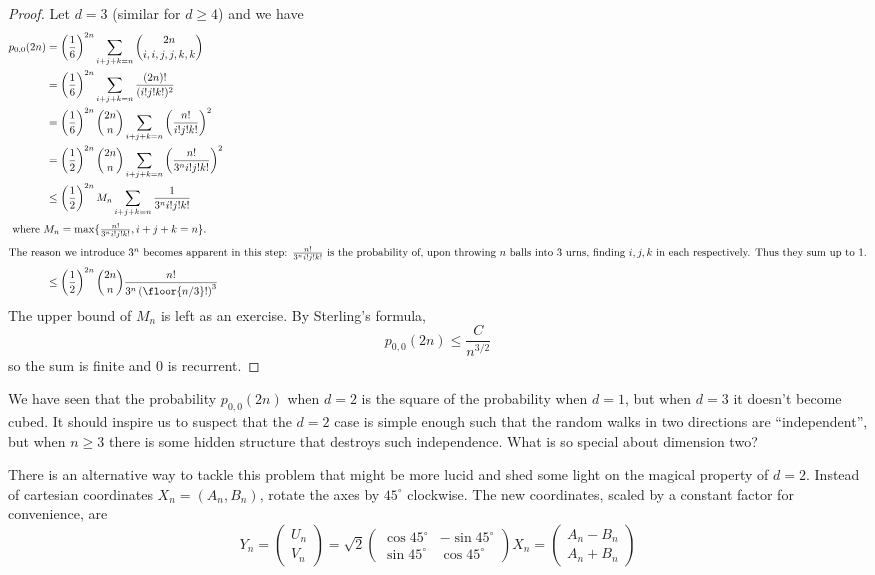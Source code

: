 \documentclass[a4paper]{article}
\begin{document}
\begin{proof}
  Let \(d = 3\) (similar for \(d \geq 4\)) and we have
  \begin{align*}
    p_{0,0}(2n) &= \left( \frac{1}{6} \right)^{2n} \sum_{i+j+k = n} \binom{2n}{i,i,j,j,k,k} \\
                &= \left( \frac{1}{6} \right)^{2n} \sum_{i+j+k = n}^{}\frac{(2n)!}{(i! j! k!)^2} \\
                &= \left( \frac{1}{6} \right)^{2n} \binom{2n}{n} \sum_{i+j+k = n}^{} \left( \frac{n!}{i! j! k!} \right)^2 \\ 
                &=  \left( \frac{1}{2} \right)^{2n} \binom{2n}{n} \sum_{i+j+k = n}^{} \left( \frac{n!}{3^n i! j! k!} \right)^2 \\
                &\leq \left( \frac{1}{2} \right)^{2n} M_n \sum_{i+j+k = n}^{}\frac{1}{3^n i! j! k!} \\
    \intertext{ where \(M_n = \max \{ \frac{n!}{3^n i!j!k!}, i+j+k = n \} \).}
    \intertext{The reason we introduce \(3^n\) becomes apparent in this step: \( \frac{n!}{3^n i! j! k!}\) is the probability of, upon throwing \(n\) balls into \(3\) urns, finding \(i, j, k\) in each respectively. Thus they sum up to \(1\).}
                &\leq \left( \frac{1}{2} \right)^{2n} \binom{2n}{n} \frac{n!}{3^n \left( \floor{n/3}! \right)^3}
  \end{align*}
  The upper bound of \(M_n\) is left as an exercise. By Sterling's formula,
  \[
    p_{0,0}(2n) \leq \frac{C}{n^{3/2}}
  \]
  so the sum is finite and \(0\) is recurrent.
\end{proof}

We have seen that the probability \(p_{0, 0}(2n)\) when \(d = 2\) is the square of the probability when \(d = 1\), but when \(d = 3\) it doesn't become cubed. It should inspire us to suspect that the \(d = 2\) case is simple enough such that the random walks in two directions are ``independent'', but when \(n \geq 3\) there is some hidden structure that destroys such independence. What is so special about dimension two?

There is an alternative way to tackle this problem that might be more lucid and shed some light on the magical property of \(d = 2\). Instead of cartesian coordinates \(X_n = (A_n, B_n)\), rotate the axes by \(45^\circ\) clockwise. The new coordinates, scaled by a constant factor for convenience, are
\[
  Y_n =
  \begin{pmatrix}
    U_n \\
    V_n
  \end{pmatrix}
  = \sqrt 2
  \begin{pmatrix}
    \cos 45^\circ & -\sin 45^\circ \\
    \sin 45^\circ & \cos 45^\circ
  \end{pmatrix} X_n
  =
  \begin{pmatrix}
    A_n - B_n \\
    A_n + B_n
  \end{pmatrix}
\]
\iffalse
\begin{align*}
  U_n &= A_n - B_n \\
  V_n &= A_n + B_n \\
  Y_n &= (U_n, V_n)
\end{align*}
\fi
\end{document}
